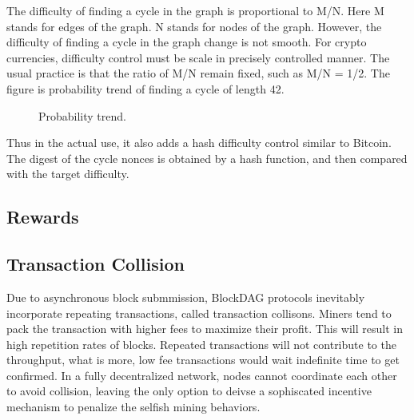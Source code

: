 \documentclass[a4paper,11pt]{article}
\begin{document}
The difficulty of finding a cycle in the graph is proportional to M/N. Here M stands for edges of the graph.
N stands for nodes of the graph. However, the difficulty of finding a cycle in the graph change is not smooth.
For crypto currencies, difficulty control must be scale in precisely controlled manner. The usual practice is
that the ratio of M/N remain fixed, such as M/N = 1/2.
The figure is probability trend of finding a cycle of length 42.

\begin{figure}[h]
	\centerline{%
	}
	\caption{Probability trend.}
\end{figure}

Thus in the actual use, it also adds a hash difficulty control similar to Bitcoin. The digest of the cycle nonces is obtained by a hash function,
and then compared with the target difficulty.

\subsection{Rewards}
\subsection{Transaction Collision}
Due to asynchronous block submmission, BlockDAG protocols inevitably incorporate repeating transactions, called transaction collisons. 
Miners tend to pack the transaction with higher fees to maximize their profit. This will result in high repetition rates of blocks. Repeated transactions will not contribute to the throughput, what is more, low fee transactions would wait indefinite time to get confirmed. In a fully decentralized network, nodes cannot coordinate each other to avoid collision, leaving the only option to deivse a sophiscated incentive mechanism to penalize the selfish mining behaviors. 
\end{document}
